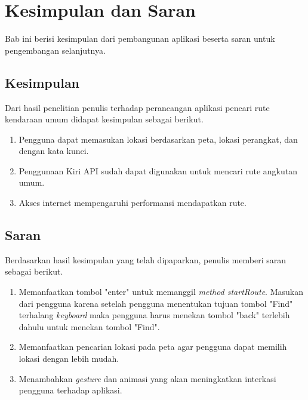 \chapter{Kesimpulan dan Saran}
\label{chap:Kesimpulan dan Saran}
Bab ini berisi kesimpulan dari pembangunan aplikasi beserta saran untuk pengembangan selanjutnya.

\section{Kesimpulan}
\label{lab:Kesimpulan}
\hspace{0.5cm} Dari hasil penelitian penulis terhadap perancangan aplikasi pencari rute kendaraan umum didapat kesimpulan sebagai berikut.
\begin{enumerate}
	\item Pengguna dapat memasukan lokasi berdasarkan peta, lokasi perangkat, dan dengan kata kunci.
	\item Penggunaan Kiri API sudah dapat digunakan untuk mencari rute angkutan umum.
	\item Akses internet mempengaruhi performansi mendapatkan rute.
\end{enumerate}

\section{Saran}
\label{lab:Saran}
\hspace{0.5cm} Berdasarkan hasil kesimpulan yang telah dipaparkan, penulis memberi saran sebagai berikut.
\begin{enumerate}
	\item Memanfaatkan tombol "enter" untuk memanggil \textit{method startRoute}. Masukan dari pengguna karena setelah pengguna menentukan tujuan tombol "Find" terhalang \textit{keyboard} maka pengguna harus menekan tombol "back" terlebih dahulu untuk menekan tombol "Find".
	\item Memanfaatkan pencarian lokasi pada peta agar pengguna dapat memilih lokasi dengan lebih mudah.
	\item Menambahkan \textit{gesture} dan animasi yang akan meningkatkan interkasi pengguna terhadap aplikasi.
\end{enumerate}
